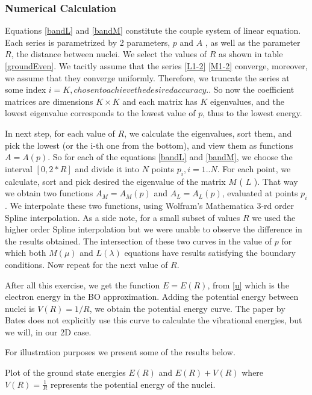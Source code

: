 \subsubsection{Numerical Calculation}

Equations \eqref{bandL} and \eqref{bandM} constitute the couple system of linear equation. Each series is parametrized by 2 parameters, $ p $ and $ A $ , as well as the parameter $ R $, the distance between nuclei. We select the values of $ R $ as shown in table \ref{groundEven}. We tacitly assume that the series \eqref{L1-2} \eqref{M1-2} converge, moreover, we assume that they converge uniformly. Therefore, we truncate the series at some index $ i = K, chosen to achieve the desired accuracy. $. So now the coefficient matrices are dimensions $ K \times K $ and each matrix has $ K $ eigenvalues, and the lowest eigenvalue corresponds to the lowest value of $ p $, thus to the lowest energy. 

 In next step, for each value of $ R $, we calculate the eigenvalues, sort them, and pick the lowest (or the i-th one from the bottom), and view them as functions $ A = A(p) $. So for each of the equations \eqref{bandL} and \eqref{bandM}, we choose the interval $\left[0, 2 * R \right] $ and divide it into $ N $ points $ p_{i}, i = 1..N $. For each point, we calculate, sort and pick desired the eigenvalue of the matrix $ M $ ( $ L $ ). That way we obtain two  functions $ A_{M} = A_{M}(p) $ and $ A_{L} = A_{L}(p) $, evaluated at points $ p_i $. We interpolate these two functions, using Wolfram's Mathematica 3-rd order Spline interpolation. 
As a side note, for a small subset of values $ R $ we used the higher order Spline interpolation but we were unable to observe the difference in the results obtained.
 The intersection of these two curves in the value of $ p $ for which both $ M(\mu) $ and $ L(\lambda) $ equations have results satisfying the boundary conditions. Now repeat for the next value of $ R $.

After all this exercise, we get the function $ E = E(R) $, from \eqref{u} which is the electron energy in the BO approximation. Adding the potential energy between nuclei is $ V(R) = 1/R $, we obtain the potential energy curve. The paper by Bates does not explicitly use this curve to calculate the vibrational energies, but we will, in our 2D case.

For illustration purposes we present some of the results below.

Plot of the ground state energies $ E(R) $ and $ E(R) + V(R) $ where $ V(R) = \frac{1}{R} $ represents the potential energy of the nuclei.

